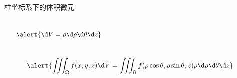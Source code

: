 \begin{frame}{柱坐标系下的体积微元}
	\linespread{1.2}
	\begin{columns}\pause 
			\begin{center}
			\end{center}
		\pause 
			{\Large
			$$\alert{\d V=\rho \d\rho \d\theta \d z}$$
			}
	\end{columns}\pause 
	$$\alert{\iiint_{\Omega}f(x,y,z)\d
	V=\iiint_{\Omega}f(\rho\cos\theta,\rho\sin\theta,z)\rho \d\rho \d\theta \d z}$$
\end{frame}

